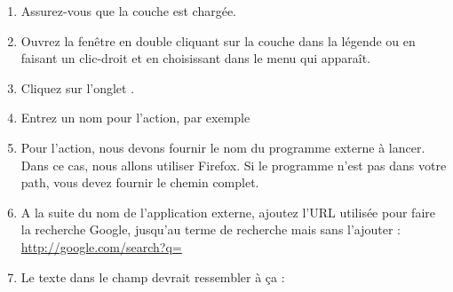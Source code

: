 \begin{enumerate}
\item Assurez-vous que la couche  est charg\'ee.
\item Ouvrez la fen\^etre  en double cliquant sur la couche dans la l\'egende ou en faisant un clic-droit et en choisissant  dans le menu qui appara\^it.
\item Cliquez sur l'onglet .
\item Entrez un nom pour l'action, par exemple 
\item Pour l'action, nous devons fournir le nom du programme externe \`a lancer. Dans ce cas, nous allons utiliser Firefox. Si le programme n'est pas dans votre path, vous devez fournir le chemin complet.
\item A la suite du nom de l'application externe, ajoutez l'URL utilis\'ee pour faire la recherche Google, jusqu'au terme de recherche mais sans l'ajouter : \url{http://google.com/search?q=}
\item Le texte dans le champ  devrait ressembler \`a \c{c}a :\\

\end{enumerate}
